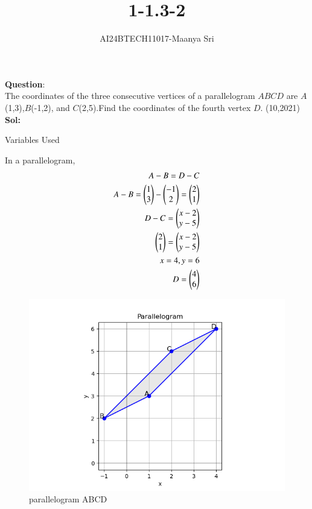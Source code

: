 \documentclass[journal]{IEEEtran}
\begin{document}

\vspace{3cm}

\title{1-1.3-2}
\author{AI24BTECH11017-Maanya Sri
}
{\let\newpage\relax\maketitle}

\renewcommand{\thefigure}{\theenumi}
\renewcommand{\thetable}{\theenumi}
\setlength{\intextsep}{10pt} %


\renewcommand{\thetable}{\theenumi}
\textbf{Question}:\\
The coordinates of the three consecutive vertices of a parallelogram $ABCD$ are $A$ (1,3),$B$(-1,2), and $C$(2,5).Find the coordinates of the fourth vertex $D$.
\hfill(10,2021)
\\ \textbf{Sol:}
\begin{table}[h!]
	\centering
	
	\caption{Variables Used}
	\label{tab1.3.2.1}
\end{table}

 In a parallelogram,
 \begin{align}
	 A-B = D-C
	 \\A-B = \begin{pmatrix}
		 1
		 \\
		 3
	 \end{pmatrix} - \begin{pmatrix}
		 -1
		 \\
		 2
	 \end{pmatrix} = \begin{pmatrix}
		 2
		 \\
		 1
	 \end{pmatrix}
	 \\ D-C = \begin{pmatrix}
		 x-2
		 \\
		 y-5
	 \end{pmatrix}
	 \\ \begin{pmatrix}
		 2
		 \\
		 1
	 \end{pmatrix} = \begin{pmatrix}
		 x-2
		 \\
		 y-5
	 \end{pmatrix}
	 \\ x=4 , y=6
	 \\ D = \begin{pmatrix}
		 4
		 \\
		 6
	 \end{pmatrix}
 \end{align}

\begin{figure}[h!]
	\centering
	\includegraphics[width=0.7\linewidth]{figure/Figure_1.png}
	\caption{parallelogram ABCD}
\end{figure}
\end{document}
